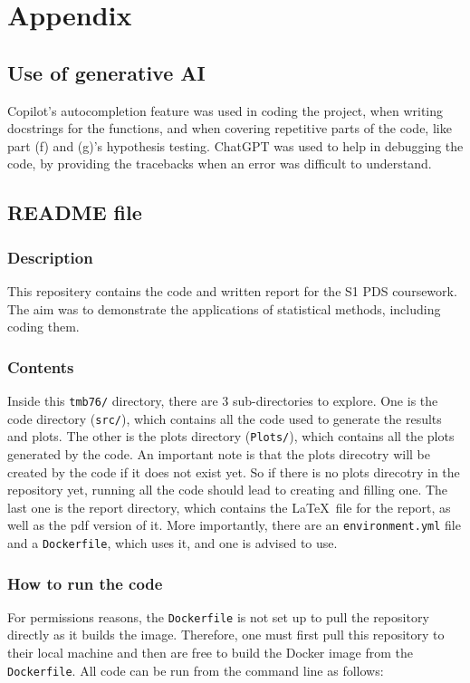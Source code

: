 \documentclass[12pt]{report} %
\begin{document}
\section*{Appendix}

\subsection*{Use of generative AI}
Copilot's autocompletion feature was used in coding the project, when writing docstrings for the functions, and when covering repetitive parts of the code, like part (f) and (g)'s hypothesis testing.
ChatGPT was used to help in debugging the code, by providing the tracebacks when an error was difficult to understand.

\subsection*{README file}

\subsubsection*{Description} 
This repositery contains the code and written report for the S1 PDS coursework. The aim was to demonstrate the applications of statistical methods, including coding them.

\subsubsection*{Contents}  
Inside this \texttt{tmb76/} directory, there are 3 sub-directories to explore. One is the code directory (\texttt{src/}), which contains all the code used to generate the results and plots. The other is the plots directory (\texttt{Plots/}), which contains all the plots generated by the code. An important note is that the plots direcotry will be created by the code if it does not exist yet. So if there is no plots direcotry in the repository yet, running all the code should lead to creating and filling one. The last one is the report directory, which contains the \LaTeX\ file for the report, as well as the pdf version of it. More importantly, there are an \texttt{environment.yml} file and a \texttt{Dockerfile}, which uses it, and one is advised to use.

\subsubsection*{How to run the code}
For permissions reasons, the \texttt{Dockerfile} is not set up to pull the repository directly as it builds the image. Therefore, one must first pull this repository to their local machine and then are free to build the Docker image from the \texttt{Dockerfile}.
All code can be run from the command line as follows:
\end{document}
